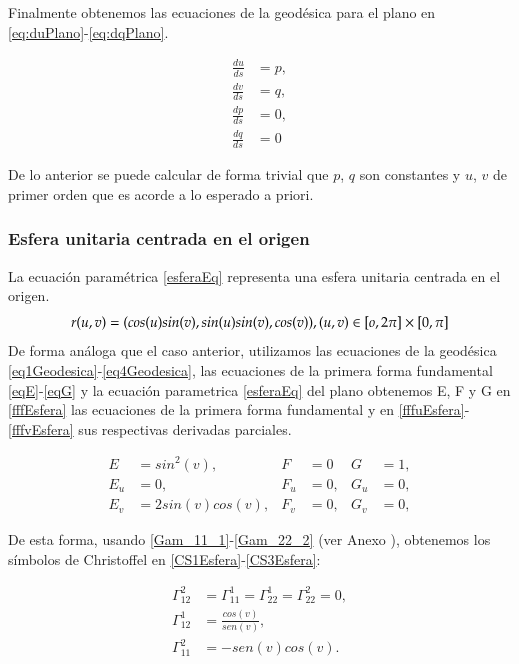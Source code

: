\documentclass{endm}
\begin{document}
Finalmente obtenemos las ecuaciones de la geod\'esica para el plano en \ref{eq:duPlano}-\ref{eq:dqPlano}.

{\small
\begin{align}
\frac{du}{ds}&=p,\label{eq:duPlano} \\
\frac{dv}{ds}&=q,\label{eq:dvPlano}     \\
\frac{dp}{ds}&=0, \label{eq:dpPlano}\\ 
\frac{dq}{ds}&=0 \label{eq:dqPlano}
\end{align}
}

De lo anterior se puede calcular de forma trivial que $p$, $q$ son constantes y $u$, $v$ de primer orden que es acorde a lo esperado a priori.

\subsubsection{Esfera unitaria centrada en el origen}

La ecuaci\'on param\'etrica \ref{esferaEq} representa una esfera unitaria centrada en el origen.
\begin{equation} \label{esferaEq}
r(u,v) = (cos (u) sin(v), sin (u) sin (v),cos (v)), \\
(u,v) \in  [o, 2 \pi] \times [0, \pi]
\end{equation}
De forma an\'aloga que el caso anterior, utilizamos las ecuaciones de la geod\'esica \ref{eq1Geodesica}-\ref{eq4Geodesica}, las ecuaciones de la primera forma fundamental \ref{eqE}-\ref{eqG} y la ecuaci\'on parametrica \ref{esferaEq} del plano obtenemos E, F y G en \ref{fffEsfera} las ecuaciones de la primera forma fundamental y en \ref{fffuEsfera}-\ref{fffvEsfera} sus respectivas derivadas parciales.

\begin{align}
E&=sin^2 (v),   & F &=0    & G&=1, \label{fffEsfera} \\
E_u&=0,     & F_u&=0,   & G_u&=0, \label{fffuEsfera}\\
E_v&=2sin(v)cos(v),    & F_v&=0,   & G_v&=0, \label{fffvEsfera}
\end{align}

De esta forma, usando \ref{Gam_11_1}-\ref{Gam_22_2} (ver Anexo \label{simbolosCr}), obtenemos los s\'imbolos de Christoffel en \ref{CS1Esfera}-\ref{CS3Esfera}:

{\small
\begin{align}
\Gamma_{12}^2&=\Gamma_{11}^1=\Gamma_{22}^1=\Gamma_{22}^2=0, \label{CS1Esfera} \\
\Gamma_{12}^1&=\frac{cos(v)}{sen(v)},  \label{CS2Esfera}   \\
\Gamma_{11}^2&=-sen(v)cos(v) .  \label{CS3Esfera}
\end{align}
}
\end{document}
